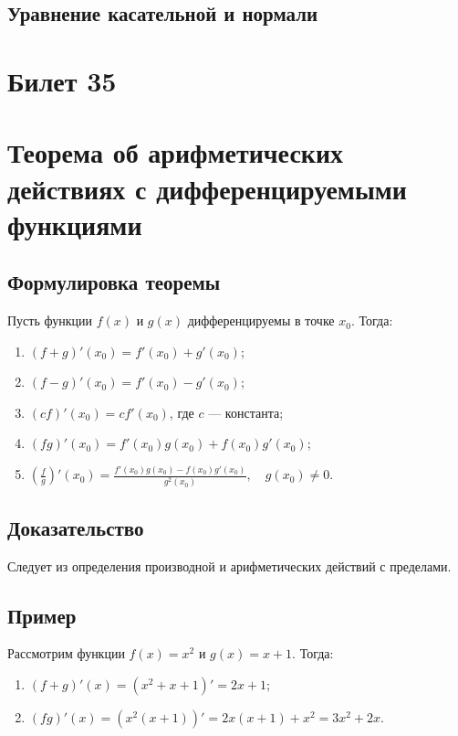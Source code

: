 \documentclass{article}
\begin{document}
\subsection{Уравнение касательной и нормали}

\section{Билет 35}

\section*{Теорема об арифметических действиях с дифференцируемыми функциями}

\subsection{Формулировка теоремы}
Пусть функции \( f(x) \) и \( g(x) \) дифференцируемы в точке \( x_0 \). Тогда:
\begin{enumerate}
    \item \( (f + g)'(x_0) = f'(x_0) + g'(x_0) \);
    \item \( (f - g)'(x_0) = f'(x_0) - g'(x_0) \);
    \item \( (cf)'(x_0) = cf'(x_0) \), где \( c \) — константа;
    \item \( (fg)'(x_0) = f'(x_0)g(x_0) + f(x_0)g'(x_0) \);
    \item \( \left(\frac{f}{g}\right)'(x_0) = \frac{f'(x_0)g(x_0) - f(x_0)g'(x_0)}{g^2(x_0)}, \quad g(x_0) \neq 0 \).
\end{enumerate}

\subsection{Доказательство}
Следует из определения производной и арифметических действий с пределами.

\subsection{Пример}
Рассмотрим функции \( f(x) = x^2 \) и \( g(x) = x + 1 \). Тогда:
\begin{enumerate}
    \item \( (f + g)'(x) = (x^2 + x + 1)' = 2x + 1 \);
    \item \( (fg)'(x) = (x^2(x + 1))' = 2x(x + 1) + x^2 = 3x^2 + 2x \).
\end{enumerate}
\end{document}
